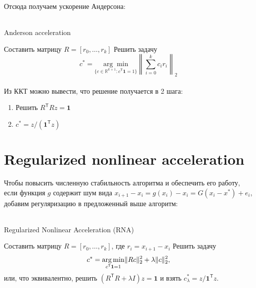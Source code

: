 \documentclass[12pt]{article}
\theoremstyle{definition}
\numberwithin{Def}{section}
\numberwithin{Th}{section}
\numberwithin{Prop}{section}
\numberwithin{St}{section}
\numberwithin{Cor}{section}
\begin{document}
Отсюда получаем ускорение Андерсона:
\\\\
\begin{algorithm*}[H]
\caption{Anderson acceleration}
\LinesNumbered
 Составить матрицу $R=[r_0,\ldots,r_k]$\;
 Решить задачу
 $$
 c^*=\underset{\{c\in\mathbb{R}^{k+1}:c^\mathsf{T}\mathbf{1}=1\}}
	{\arg\min}\left\|\sum_{i=0}^kc_ir_i\right\|_2
 $$
 
 
\end{algorithm*}

\paragraph{}
Из ККТ можно вывести, что решение получается в 2 шага:
\begin{enumerate}
	\item Решить $R^\mathsf{T}Rz=\mathbf{1}$
	\item $c^*=z/(\mathbf{1}^\mathsf{T}z)$
\end{enumerate}

\section{Regularized nonlinear acceleration}

Чтобы повысить численную стабильность алгоритма и обеспечить его работу, если
функция $g$ содержит шум вида $x_{i+1}-x_i=g(x_i)-x_i=G(x_i-x^*)+e_i$,
добавим регуляризацию в предложенный выше алгоритм:
\\\\
\begin{algorithm*}[H]
\caption{Regularized Nonlinear Acceleration (RNA)}
\LinesNumbered
 Составить матрицу $R=[r_0,\ldots,r_k]$, где $r_i=x_{i+1}-x_i$\;
 Решить задачу
 $$
 c^*=\underset{c^\mathsf{T}\mathbf{1}=1}{\arg\min}\|Rc\|_2^2+\lambda\|c\|_2^2,
 $$
 или, что эквивалентно, решить $(R^\mathsf{T}R+\lambda I)z=\mathbf{1}$ и взять
 $c^*_\lambda=z/\mathbf{1}^\mathsf{T}z$.
 
\end{algorithm*}
\end{document}
